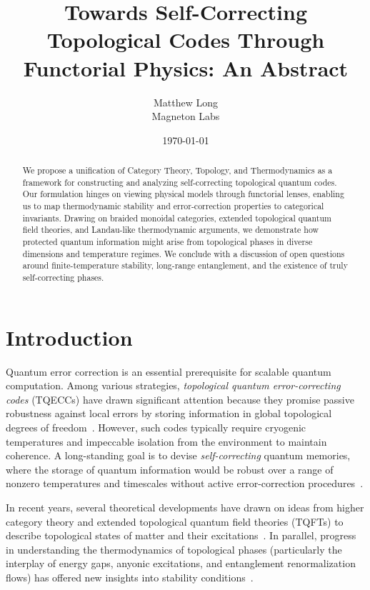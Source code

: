 \documentclass[12pt]{article}
\title{\textbf{Towards Self-Correcting Topological Codes Through Functorial Physics: An Abstract}}
\author{Matthew Long \\
Magneton Labs}
\date{\today}
\begin{document}
\maketitle

\begin{abstract}
We propose a unification of Category Theory, Topology, and Thermodynamics as a framework for constructing and analyzing self-correcting topological quantum codes. Our formulation hinges on viewing physical models through functorial lenses, enabling us to map thermodynamic stability and error-correction properties to categorical invariants. Drawing on braided monoidal categories, extended topological quantum field theories, and Landau-like thermodynamic arguments, we demonstrate how protected quantum information might arise from topological phases in diverse dimensions and temperature regimes. We conclude with a discussion of open questions around finite-temperature stability, long-range entanglement, and the existence of truly self-correcting phases.
\end{abstract}

\tableofcontents

\section{Introduction}
Quantum error correction is an essential prerequisite for scalable quantum computation. Among various strategies, \emph{topological quantum error-correcting codes} (TQECCs) have drawn significant attention because they promise passive robustness against local errors by storing information in global topological degrees of freedom~\cite{kitaev2003fault, dennis2002topological}. However, such codes typically require cryogenic temperatures and impeccable isolation from the environment to maintain coherence. A long-standing goal is to devise \emph{self-correcting} quantum memories, where the storage of quantum information would be robust over a range of nonzero temperatures and timescales without active error-correction procedures~\cite{brown2020quantum, bombin2015gauge}.

In recent years, several theoretical developments have drawn on ideas from higher category theory and extended topological quantum field theories (TQFTs) to describe topological states of matter and their excitations~\cite{turaev2010hqft, kassel2008quantum}. In parallel, progress in understanding the thermodynamics of topological phases (particularly the interplay of energy gaps, anyonic excitations, and entanglement renormalization flows) has offered new insights into stability conditions~\cite{castelnovo2008topological, chesi2010self}. 
\end{document}
